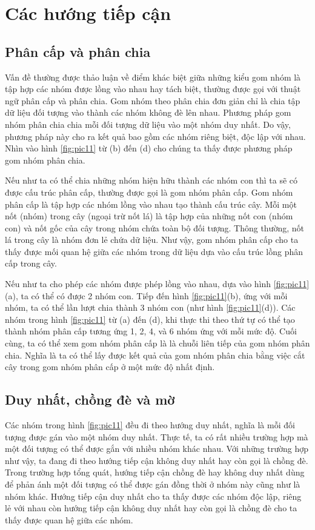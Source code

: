 \section{Các hướng tiếp cận}
\subsection{Phân cấp và phân chia}
Vấn đề thường được thảo luận về điểm khác biệt giữa những kiểu gom nhóm là tập hợp các nhóm được lồng vào nhau hay tách biệt, thường được gọi với thuật ngữ phân cấp và phân chia.
Gom nhóm theo phân chia đơn giản chỉ là chia tập dữ liệu đối tượng vào thành các nhóm không đè lên nhau.
Phương pháp gom nhóm phân chia chia mỗi đối tượng dữ liệu vào một nhóm duy nhất.
Do vậy, phương pháp này cho ra kết quả bao gồm các nhóm riêng biệt, độc lập với nhau.
Nhìn vào hình \ref{fig:pic11} từ (b) đến (d) cho chúng ta thấy được phương pháp gom nhóm phân chia.

Nếu như ta có thể chia những nhóm hiện hữu thành các nhóm con thì ta sẽ có được cấu trúc phân cấp, thường được gọi là gom nhóm phân cấp.
Gom nhóm phân cấp là tập hợp các nhóm lồng vào nhau tạo thành cấu trúc cây.
Mỗi một nốt (nhóm) trong cây (ngoại trừ nốt lá) là tập hợp của những nốt con (nhóm con) và nốt gốc của cây trong nhóm chứa toàn bộ đối tượng.
Thông thường, nốt lá trong cây là nhóm đơn lẻ chứa dữ liệu.
Như vậy, gom nhóm phân cấp cho ta thấy được mối quan hệ giữa các nhóm trong dữ liệu dựa vào cấu trúc lồng phân cấp trong cây.

Nếu như ta cho phép các nhóm được phép lồng vào nhau, dựa vào hình \ref{fig:pic11}(a), ta có thể có được 2 nhóm con.
Tiếp đến hình \ref{fig:pic11}(b), ứng với mỗi nhóm, ta có thể lần lượt chia thành 3 nhóm con (như hình \ref{fig:pic11}(d)).
Các nhóm trong hình \ref{fig:pic11} từ (a) đến (d), khi thực thi theo thứ tự có thể tạo thành nhóm phân cấp tương ứng 1, 2, 4, và 6 nhóm ứng với mỗi mức độ.
Cuối cùng, ta có thể xem gom nhóm phân cấp là là chuỗi liên tiếp của gom nhóm phân chia.
Nghĩa là ta có thể lấy được kết quả của gom nhóm phân chia bằng việc cắt cây trong gom nhóm phân cấp ở một mức độ nhất định.

\subsection{Duy nhất, chồng đè và mờ}
Các nhóm trong hình \ref{fig:pic11} đều đi theo hướng duy nhất, nghĩa là mỗi đối tượng được gán vào một nhóm duy nhất.
Thực tế, ta có rất nhiều trường hợp mà một đối tượng có thể được gắn với nhiều nhóm khác nhau.
Với những trường hợp như vậy, ta đang đi theo hướng tiếp cận không duy nhất hay còn gọi là chồng đè.
Trong trường hợp tổng quát, hướng tiếp cận chồng đè hay không duy nhất dùng để phản ánh một đối tượng có thể được gán đồng thời ở nhóm này cũng như là nhóm khác.
Hướng tiếp cận duy nhất cho ta thấy được các nhóm độc lập, riêng lẻ với nhau còn hướng tiếp cận không duy nhất hay còn gọi là chồng đè cho ta thấy được quan hệ giữa các nhóm.

